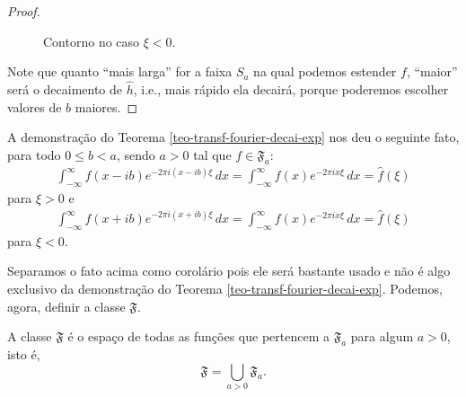 \begin{proof}
\begin{figure}[H]
				\caption{Contorno no caso $\xi < 0$.}
			\end{figure}
            Note que quanto ``mais larga'' for a faixa $S_a$ na qual podemos estender $f$, ``maior'' será o 
            decaimento de $\widehat{h}$, i.e., mais rápido ela decairá, porque poderemos escolher valores de
            $b$ maiores.
        \end{proof}
        \begin{corolario}
        \label{transf-fourier-inv-por-shift}
            A demonstração do Teorema \ref{teo-transf-fourier-decai-exp} nos deu o seguinte fato,
            para todo $0\leq b < a$, sendo $a > 0$ tal que $f\in\mathfrak{F}_a$:
            \begin{align*}
                \int_{-\infty}^{\infty} f(x-ib)e^{-2\pi i(x-ib)\xi} \, dx
                =
                \int_{-\infty}^{\infty} f(x)e^{-2\pi ix\xi} \, dx
                =
                \widehat{f}(\xi)
            \end{align*}
            para $\xi > 0$ e
            \begin{align*}
                \int_{-\infty}^{\infty} f(x+ib)e^{-2\pi i(x+ib)\xi} \, dx
                =
                \int_{-\infty}^{\infty} f(x)e^{-2\pi ix\xi} \, dx
                =
                \widehat{f}(\xi)
            \end{align*}
            para $\xi < 0$.
        \end{corolario}
        Separamos o fato acima como corolário pois ele será bastante usado e não é algo exclusivo da
        demonstração do Teorema \ref{teo-transf-fourier-decai-exp}. Podemos, agora, definir a classe
        $\mathfrak{F}$.
        \begin{definicao}
        \label{def-classe-F}
            A classe $\mathfrak{F}$ é o espaço de todas as funções que pertencem a $\mathfrak{F}_a$
            para algum $a>0$, isto é,
            \begin{equation*}
                \mathfrak{F} = \bigcup_{a>0} \mathfrak{F}_a.
            \end{equation*}
        \end{definicao}
